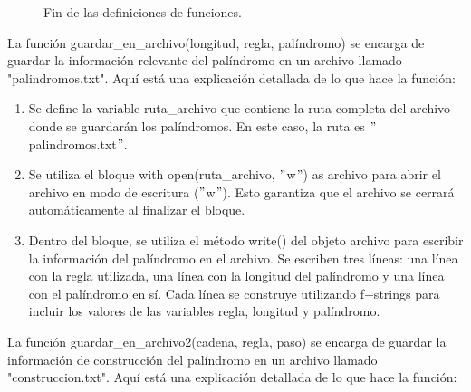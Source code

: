 \begin{figure}[h]
\begin{center}
\end{center}
\caption{Fin de las definiciones de funciones.}
\label{fig:imagen}
\end{figure}

La función guardar\_en\_archivo(longitud, regla, palíndromo) se encarga de guardar la información relevante del palíndromo en un archivo llamado "palindromos.txt". Aquí está una explicación detallada de lo que hace la función:\newline

\begin{enumerate}
\item Se define la variable ruta\_archivo que contiene la ruta completa del archivo donde se guardarán los palíndromos. En este caso, la ruta es $"$palindromos.txt$"$.\newline

\item Se utiliza el bloque with open(ruta\_archivo, $"$w$"$) as archivo para abrir el archivo en modo de escritura ($"$w$"$). Esto garantiza que el archivo se cerrará automáticamente al finalizar el bloque.\newline

\item Dentro del bloque, se utiliza el método write() del objeto archivo para escribir la información del palíndromo en el archivo. Se escriben tres líneas: una línea con la regla utilizada, una línea con la longitud del palíndromo y una línea con el palíndromo en sí. Cada línea se construye utilizando f$-$strings para incluir los valores de las variables regla, longitud y palíndromo.\newline
\end{enumerate}

La función guardar\_en\_archivo2(cadena, regla, paso) se encarga de guardar la información de construcción del palíndromo en un archivo llamado "construccion.txt". Aquí está una explicación detallada de lo que hace la función:\newline


